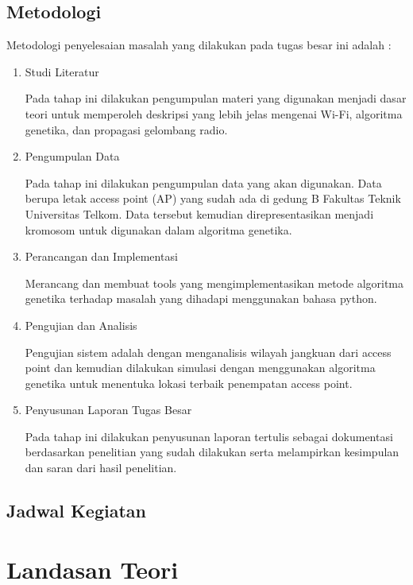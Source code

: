 \documentclass[12pt,a4paper,oneside,titlepage]{report}
\begin{document}
		\section{Metodologi}
		Metodologi penyelesaian masalah yang dilakukan pada tugas besar ini adalah :
		\begin{enumerate}
			\item Studi Literatur
			
			Pada tahap ini dilakukan pengumpulan materi yang digunakan menjadi dasar teori untuk memperoleh deskripsi yang lebih jelas mengenai Wi-Fi, algoritma genetika, dan propagasi gelombang radio.
			
			\item Pengumpulan Data
			
			Pada tahap ini dilakukan pengumpulan data yang akan digunakan. Data berupa letak access point (AP) yang sudah ada di gedung B Fakultas Teknik Universitas Telkom. Data tersebut kemudian direpresentasikan menjadi kromosom untuk  digunakan dalam algoritma genetika.
			
			\item Perancangan dan Implementasi
			
			Merancang dan membuat tools yang mengimplementasikan metode algoritma genetika terhadap masalah yang dihadapi menggunakan bahasa python.
			
			\item Pengujian dan Analisis
			
			Pengujian sistem adalah dengan menganalisis wilayah jangkuan dari access point dan kemudian dilakukan simulasi dengan menggunakan algoritma genetika untuk menentuka lokasi terbaik penempatan access point.
			
			\item Penyusunan Laporan Tugas Besar
			
			Pada tahap ini dilakukan penyusunan laporan tertulis sebagai dokumentasi berdasarkan penelitian yang sudah dilakukan serta melampirkan kesimpulan dan saran dari hasil penelitian.
		\end{enumerate}
		
		
		\section{Jadwal Kegiatan}
		\newpage
		
		\chapter{Landasan Teori}
\end{document}
